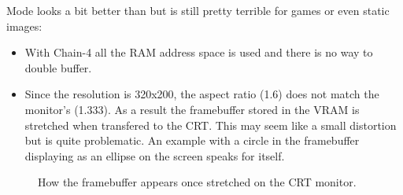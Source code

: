 \documentclass[book.tex]{subfiles}
\begin{document}
  \begin{minipage}{\textwidth}
  
  \end{minipage}
  \label{clearvga}
  \par
  Mode  looks a bit better than  but is still pretty terrible for games or even static images:\\
  \begin{itemize}
\item With Chain-4 all the RAM address space is used and there is no way to double buffer.
\item Since the resolution is 320x200, the aspect ratio (1.6) does not match the monitor's (1.333). As a result the framebuffer stored in the VRAM is stretched when transfered to the CRT. This may seem like a small distortion but is quite problematic. An example with a circle in the framebuffer displaying as an ellipse on the screen speaks for itself.
\end{itemize}

\begin{figure}[H]
  \centering
\end{figure}

\begin{figure}[H]
  \centering
  \caption{How the framebuffer appears once stretched on the CRT monitor.}
\end{figure}
\par
\end{document}
